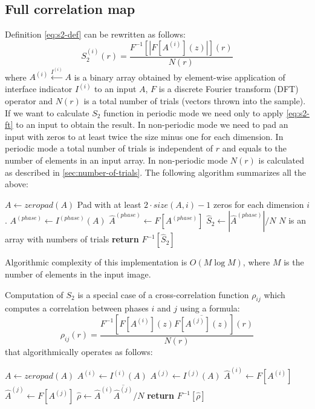 \documentclass[1p]{elsarticle}
\begin{document}
\subsection{Full correlation map}
\label{sec:map}
Definition \cref{eq:s2-def} can be rewritten as follows:
\begin{equation}
  S_2^{(i)}(r) = \frac{F^{-1} [|F [A^{(i)}](z)|] (r)}{N(r)} \label{eq:s2-ft}
\end{equation}
where $A^{(i)} \xleftarrow{I^{(i)}} A$ is a binary array obtained by element-wise
application of interface indicator $I^{(i)}$ to an input $A$, $F$ is a discrete
Fourier transform (DFT) operator and $N(r)$ is a total number of trials (vectors
thrown into the sample). If we want to calculate $S_2$ function in periodic mode
we need only to apply \cref{eq:s2-ft} to an input to obtain the result. In
non-periodic mode we need to pad an input with zeros to at least twice the size
minus one for each dimension. In periodic mode a total number of trials is
independent of $r$ and equals to the number of elements in an input array. In
non-periodic mode $N(r)$ is calculated as described in
\cref{sec:number-of-trials}. The following algorithm summarizes all the above:
\begin{algorithmic}[1]
  \State $A \gets zeropad(A)$
  \Comment Pad with at least $2\cdot size(A, i) - 1$ zeros for each dimension $i$.
  \EndIf
  \State $A^{(phase)} \gets I^{(phase)} (A)$
  \State $\hat{A}^{(phase)} \gets F[A^{(phase)}]$
  \State $\hat{S}_2 \gets |\hat{A}^{(phase)}| / N$
  \Comment $N$ is an array with numbers of trials
  \State \textbf{return} $F^{-1} [\hat{S}_2]$
  \EndProcedure
\end{algorithmic}
Algorithmic complexity of this implementation is $O(M \log M)$, where $M$ is the
number of elements in the input image.

Computation of $S_2$ is a special case of a cross-correlation function $\rho_{ij}$
which computes a correlation between phases $i$ and $j$ using a formula:
\begin{equation}
  \rho_{ij}(r) = \frac{F^{-1} [F[A^{(i)}](z) \overline{F[A^{(j)}](z)}] (r)}{N(r)} \label{eq:cross-ft}
\end{equation}
that algorithmically operates as follows:
\begin{algorithmic}[1]
    \State $A \gets zeropad(A)$
  \EndIf
  \State $A^{(i)} \gets I^{(i)} (A)$
  \State $A^{(j)} \gets I^{(j)} (A)$
  \State $\hat{A}^{(i)} \gets F[A^{(i)}]$
  \State $\hat{A}^{(j)} \gets F[A^{(j)}]$
  \State $\hat{\rho} \gets \hat{A}^{(i)} \overline{\hat{A}^{(j)}} / N$
  \State \textbf{return} $F^{-1} [\hat{\rho}]$
  \EndProcedure
\end{algorithmic}
\end{document}
